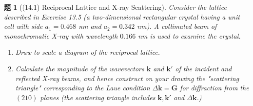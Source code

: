\documentclass[UTF8,10pt,a4paper]{article}
\theoremstyle{Problem}
\newtheorem{prob}{题}
\theoremstyle{Solution}
\begin{document}
\thispagestyle{FirstPageStyle}
\begin{prob}[(14.1) Reciprocal Lattice and X-ray Scattering]
    Consider the lattice described in Exercise 13.5 (a two-dimensional rectangular crystal having a unit cell with side $a_1=0.468$ nm and $a_2=0.342$ nm). A collimated beam of monochromatic X-ray with wavelength $0.166$ nm is used to examine the crystal.
    \begin{enumerate}
        \item[(a)] Draw to scale a diagram of the reciprocal lattice.
        \item[(b)] Calculate the magnitude of the wavevectors $\bm{k}$ and $\bm{k}'$ of the incident and reflected X-ray beams, and hence construct on your drawing the "scattering triangle" corresponding to the Laue condition $\Delta\bm{k}=\bm{G}$ for diffraction from the $(210)$ planes (the scattering triangle includes $\bm{k},\bm{k}'$ and $\Delta\bm{k}$.)
    \end{enumerate}
\end{prob}
\end{document}
